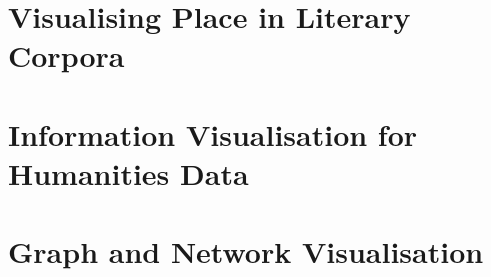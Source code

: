 \documentclass[logo,msc]{infthesis}
\begin{document}
\section{Visualising Place in Literary Corpora}
%
%
%
%

\section{Information Visualisation for Humanities Data}
%

\section{Graph and Network Visualisation}
%
\end{document}
